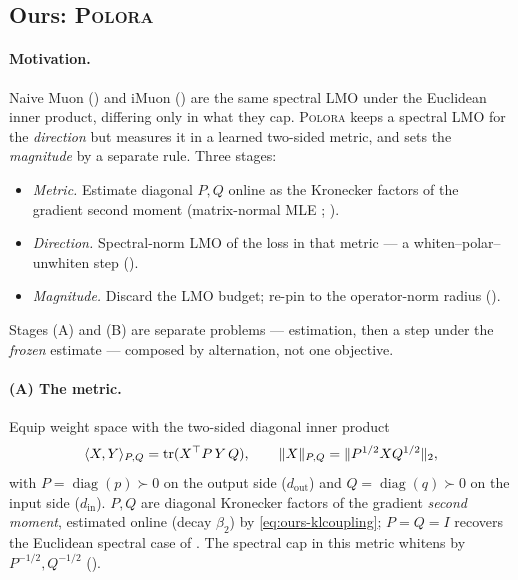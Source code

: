 \documentclass[11pt]{article}
\DeclareMathOperator{\diag}{diag}
\DeclarePairedDelimiter{\norm}{\lVert}{\rVert}
\newcommand{\methodname}{\textsc{Polora}\xspace}
\theoremstyle{plain}
\theoremstyle{definition}
\theoremstyle{remark}
\begin{document}
\subsection{Ours: \methodname}
\label{sec:method-ours}
\paragraph{Motivation.} Naive Muon () and iMuon () are the same spectral LMO under the Euclidean inner product, differing only in what they cap. \methodname{} keeps a spectral LMO for the \emph{direction} but measures it in a learned two-sided metric, and sets the \emph{magnitude} by a separate rule. Three stages:
\begin{itemize}[leftmargin=1.7em,itemsep=1pt,topsep=2pt]
  \item[(A)] \emph{Metric.} Estimate diagonal $P,Q$ online as the Kronecker factors of the gradient second moment (matrix-normal MLE \cite{klshampoo}; ).
  \item[(B)] \emph{Direction.} Spectral-norm LMO of the loss in that metric --- a whiten--polar--unwhiten step ().
  \item[(C)] \emph{Magnitude.} Discard the LMO budget; re-pin to the operator-norm radius ().
\end{itemize}
Stages (A) and (B) are separate problems --- estimation, then a step under the \emph{frozen} estimate --- composed by alternation, not one objective.

\paragraph{(A) The metric.} Equip weight space with the two-sided diagonal inner product
\begin{equation}
  \langle X,Y\rangle_{P,Q}=\operatorname{tr}(X^\top P\,Y\,Q),\qquad
  \norm{X}_{P,Q}=\norm{P^{1/2}XQ^{1/2}}_2,
  \label{eq:ours-metric}
\end{equation}
with $P=\diag(p)\succ0$ on the output side ($d_{\mathrm{out}}$) and $Q=\diag(q)\succ0$ on the input side ($d_{\mathrm{in}}$). $P,Q$ are diagonal Kronecker factors of the gradient \emph{second moment}, estimated online (decay $\beta_2$) by \eqref{eq:ours-klcoupling}; $P=Q=I$ recovers the Euclidean spectral case of . The spectral cap in this metric whitens by $P^{-1/2},Q^{-1/2}$ ().
\end{document}
